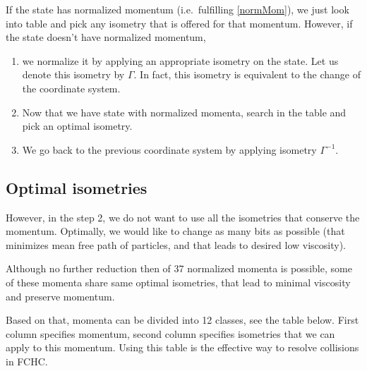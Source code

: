 If the state has normalized momentum (i.e.\ fulfilling \ref{normMom}), we just look into table and pick any isometry that is offered for that momentum. However, if the state doesn't have normalized momentum,
\begin{enumerate}
\item we normalize it by applying an appropriate isometry on the state. Let us denote this isometry by $\Gamma$. In fact, this isometry is equivalent to the change of the coordinate system.

\item Now that we have state with normalized momenta, search in the table and pick an optimal isometry.

\item We go back to the previous coordinate system by applying isometry $\Gamma^{-1}$.
\end{enumerate}

\subsection{Optimal isometries}

However, in the step 2, we do not want to use all the isometries that conserve the momentum.
Optimally, we would like to change as many bits as possible (that minimizes mean free path of particles, and that leads to desired low viscosity).

Although no further reduction then of 37 normalized momenta is possible,
some of these momenta share same optimal isometries, that lead to minimal viscosity and preserve momentum.

Based on that,  momenta can be divided into 12 classes, see the table below.
First column specifies momentum, second column specifies isometries that we can apply to this momentum. Using this table is the effective way to resolve collisions in FCHC.

